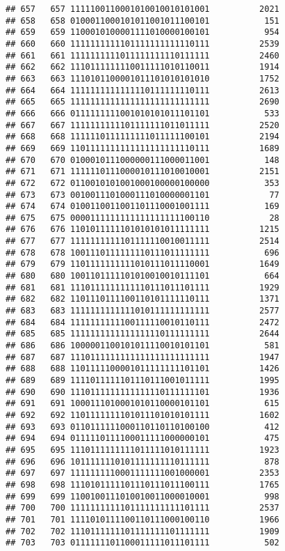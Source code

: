 \documentclass[]{article}
\begin{document}
\begin{verbatim}
## 657   657 1111100110001010010010101001          2021
## 658   658 0100011000101011001011100101           151
## 659   659 1100010100001111010000100101           954
## 660   660 1111111111101111111111110111          2539
## 661   661 1111111111011111111110111111          2460
## 662   662 1110111111110011111010110011          1914
## 663   663 1110101100001011101010101010          1752
## 664   664 1111111111111110111111110111          2613
## 665   665 1111111111111111111111111111          2690
## 666   666 0111111111001010101011101101           533
## 667   667 1111111111101111111011011111          2520
## 668   668 1111110111111111011111100101          2194
## 669   669 1101111111111111111111110111          1689
## 670   670 0100010111000000111000011001           148
## 671   671 1111110111000010111010010001          2151
## 672   672 0110010101001000100000100000           353
## 673   673 0010011101000111010000001101            77
## 674   674 0100110011001101110001001111           169
## 675   675 0000111111111111111111100110            28
## 676   676 1101011111101010101011111111          1215
## 677   677 1111111111101111110010011111          2514
## 678   678 1001110111111110111011111111           696
## 679   679 1101111111111010111011110001          1649
## 680   680 1001101111101010010010111101           664
## 681   681 1110111111111110111011101111          1929
## 682   682 1101110111100110101111110111          1371
## 683   683 1111111111111010111111111111          2577
## 684   684 1111111111100111110010110111          2472
## 685   685 1111111111111111110111111111          2644
## 686   686 1000001100101011110010101101           581
## 687   687 1110111111111111111111111111          1947
## 688   688 1101111100001011111111101101          1426
## 689   689 1111011111101110111001011111          1995
## 690   690 1110111111111111110111111101          1936
## 691   691 1000111010001010110000101101           615
## 692   692 1101111111101011101010101111          1602
## 693   693 0110111111000110110110100100           412
## 694   694 0111110111100011111000000101           475
## 695   695 1110111111111011111010111111          1923
## 696   696 1011111110101111111110111111           878
## 697   697 1111111110001111111001000001          2353
## 698   698 1110101111101110111011100111          1765
## 699   699 1100100111010010011000010001           998
## 700   700 1111111111101111111111101111          2537
## 701   701 1111010111100110111000100110          1966
## 702   702 1110111111101111111101111111          1909
## 703   703 0111111101100011111011101111           502

\end{verbatim}
\end{document}
